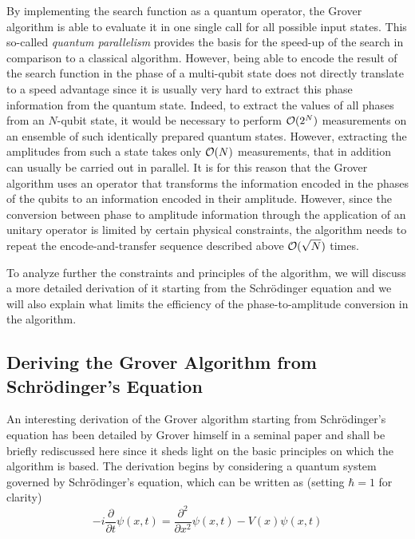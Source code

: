 By implementing the search function as a quantum operator, the Grover algorithm is able to evaluate it in one single call for all possible input states. This so-called {\it quantum parallelism} provides the basis for the speed-up of the search in comparison to a classical algorithm. However, being able to encode the result of the search function in the phase of a multi-qubit state does not directly translate to a speed advantage since it is usually very hard to extract this phase information from the quantum state. Indeed, to extract the values of all phases from an $N$-qubit state, it would be necessary to perform $\begin{mathcal}O(2^N)\end{mathcal}$ measurements on an ensemble of such identically prepared quantum states. However, extracting the amplitudes from such a state takes only $\begin{mathcal}O\end{mathcal}(N)$ measurements, that in addition can usually be carried out in parallel. It is for this reason that the Grover algorithm uses an operator that transforms the information encoded in the phases of the qubits to an information encoded in their amplitude. However, since the conversion between phase to amplitude information through the application of an unitary operator is limited by certain physical constraints, the algorithm needs to repeat the encode-and-transfer sequence described above $\begin{mathcal}O(\sqrt{N})\end{mathcal}$ times. \cite{lloyd_quantum_1999,meyer_sophisticated_2000,lanyon_experimental_2008,ahn_information_2000,ding_review_2007,linden_good_2001,braunstein_speed-up_2002}

\smallskip

To analyze further the constraints and principles of the algorithm, we will discuss a more detailed derivation of it starting from the Schrödinger equation and we will also explain what limits the efficiency of the phase-to-amplitude conversion in the algorithm.

\subsection{Deriving the Grover Algorithm from Schrödinger's Equation}


An interesting derivation of the Grover algorithm starting from Schrödinger's equation has been detailed by Grover himself in a seminal paper \citep{grover_schrodingers_2001} and shall be briefly rediscussed here since it sheds light on the basic principles on which the algorithm is based. The derivation begins by considering a quantum system governed by Schrödinger's equation, which can be written as (setting $\hbar = 1$ for clarity)
%
\begin{equation}
-i\frac{\partial}{\partial t}\psi(x,t) = \frac{\partial^2}{\partial x^2}\psi(x,t)-V(x)\psi(x,t) \label{eq:grover_derivation}
\end{equation}
%

